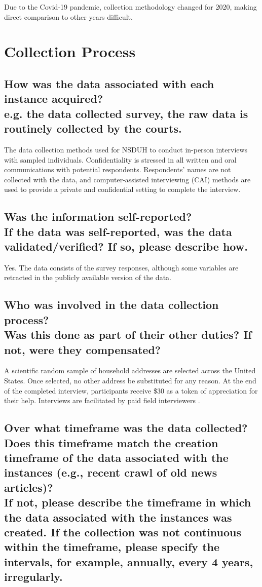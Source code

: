 \documentclass[letterpaper, 10 pt, conference]{ieeeconf}  %
\newcommand{\subtitle}[1]{{\\ \small \normalfont \color{purple} #1}}
\begin{document}
Due to the Covid-19 pandemic, collection methodology changed for 2020, making direct comparison to other years difficult. 

\section{Collection Process}

\subsection{How was the data associated with each instance acquired? \subtitle {e.g. the data collected survey, the raw data is routinely collected by the courts.}}

The data collection methods used for NSDUH to conduct in-person interviews with sampled individuals. Confidentiality is stressed in all written and oral communications with potential respondents. Respondents' names are not collected with the data, and computer-assisted interviewing (CAI) methods are used to provide a private and confidential setting to complete the interview.

\subsection{Was the information self-reported? \subtitle{If the data was self-reported, was the data validated/verified? If so, please describe how.}}

Yes. The data consists of the survey responses, although some variables are retracted in the publicly available version of the data.

\subsection{Who was involved in the data collection process? \subtitle{Was this done as part of their other duties? If not, were they compensated?}}

A scientific random sample of household addresses are selected across the United States. Once selected, no other address be substituted for any reason. At the end of the completed interview, participants receive \$30 as a token  of appreciation for their help. Interviews are facilitated by paid field interviewers \cite{nsduh_method}. 


\subsection{Over what timeframe was the data collected? Does this timeframe match the creation timeframe of the data associated with the instances (e.g., recent crawl of old news articles)? \subtitle{If not, please describe the timeframe in which the data associated with the instances was created. If the collection was not continuous within the timeframe, please specify the intervals, for example, annually, every 4 years, irregularly.}}
\end{document}
